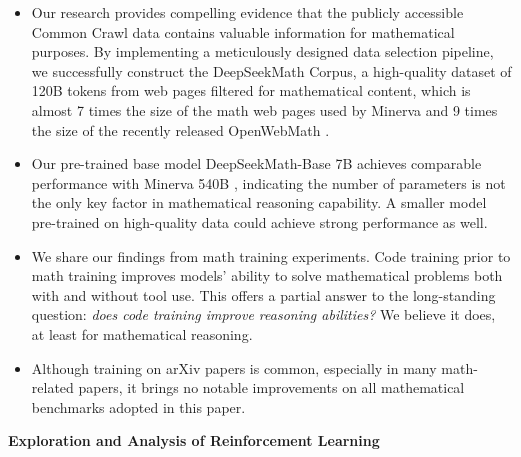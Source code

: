 \begin{itemize}[topsep=0pt]
    \item Our research provides compelling evidence that the publicly accessible Common Crawl data contains valuable information for mathematical purposes. By implementing a meticulously designed data selection pipeline, we successfully construct the DeepSeekMath Corpus, a high-quality dataset of 120B tokens from web pages filtered for mathematical content, which is almost 7 times the size of the math web pages used by Minerva \citep{minerva} and 9 times the size of the recently released OpenWebMath \citep{openwebmath}.

    \item Our pre-trained base model DeepSeekMath-Base 7B achieves comparable performance with Minerva 540B \citep{minerva}, indicating the number of parameters is not the only key factor in mathematical reasoning capability. A smaller model pre-trained on high-quality data could achieve strong performance as well. 

    \item We share our findings from math training experiments. Code training prior to math training improves models' ability to solve mathematical problems both with and without tool use. This offers a partial answer to the long-standing question: \textit{does code training improve reasoning abilities?} We believe it does, at least for mathematical reasoning.

    \item Although training on arXiv papers is common, especially in many math-related papers, it brings no notable improvements on all mathematical benchmarks adopted in this paper.
\end{itemize}

\textbf{Exploration and Analysis of Reinforcement Learning}

